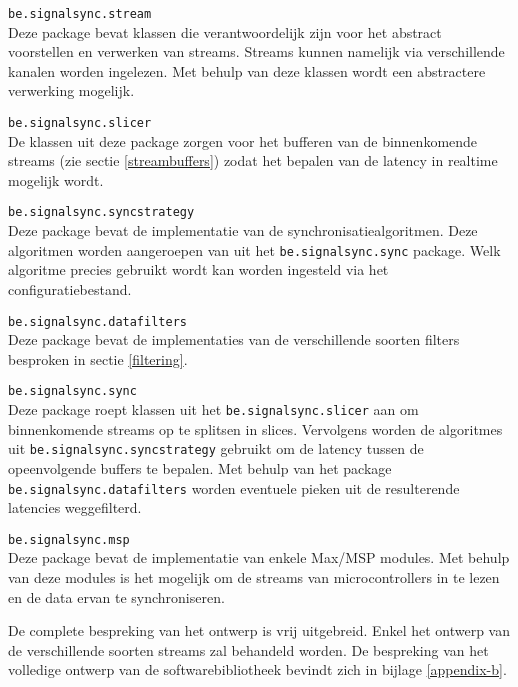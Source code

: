 \begin{description}	
	\item\texttt{be.signalsync.stream} \hfill \\
	Deze package bevat klassen die verantwoordelijk zijn voor het abstract voorstellen en verwerken van streams. Streams kunnen namelijk via verschillende kanalen worden ingelezen. Met behulp van deze klassen wordt een abstractere verwerking mogelijk.
	
	\item\texttt{be.signalsync.slicer} \hfill \\
	De klassen uit deze package zorgen voor het bufferen van de binnenkomende streams (zie sectie \ref{streambuffers}) zodat het bepalen van de latency in realtime mogelijk wordt. 

	\item\texttt{be.signalsync.syncstrategy} \hfill \\
	Deze package bevat de implementatie van de synchronisatiealgoritmen. Deze algoritmen worden aangeroepen van uit het \texttt{be.signalsync.sync} package. Welk algoritme precies gebruikt wordt kan worden ingesteld via het configuratiebestand.
	
	\item\texttt{be.signalsync.datafilters} \hfill \\
	Deze package bevat de implementaties van de verschillende soorten filters besproken in sectie \ref{filtering}.
	
	\item\texttt{be.signalsync.sync} \hfill \\
	Deze package roept klassen uit het \texttt{be.signalsync.slicer} aan om binnenkomende streams op te splitsen in slices. Vervolgens worden de algoritmes uit \texttt{be.signalsync.syncstrategy} gebruikt om de latency tussen de opeenvolgende buffers te bepalen. Met behulp van het package \texttt{be.signalsync.datafilters} worden eventuele pieken uit de resulterende latencies weggefilterd.

	\item\texttt{be.signalsync.msp} \hfill \\
	Deze package bevat de implementatie van enkele Max/MSP modules. Met behulp van deze modules is het mogelijk om de streams van microcontrollers in te lezen en de data ervan te synchroniseren.
	
\end{description}

De complete bespreking van het ontwerp is vrij uitgebreid. Enkel het ontwerp van de verschillende soorten streams zal behandeld worden. De bespreking van het volledige ontwerp van de softwarebibliotheek bevindt zich in bijlage \ref{appendix-b}.

